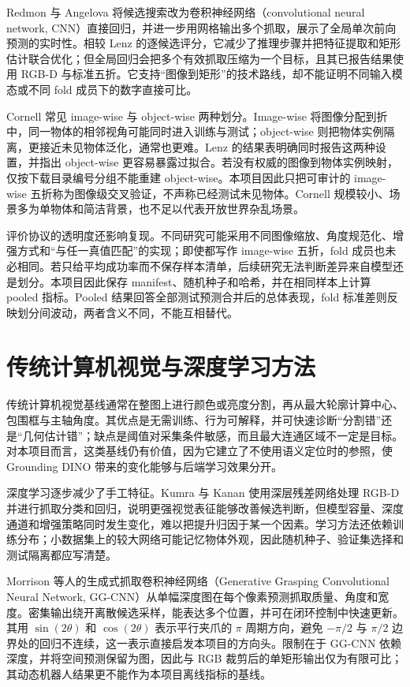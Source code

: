 \documentclass{l4proj}
\begin{document}
Redmon 与 Angelova 将候选搜索改为卷积神经网络（convolutional neural network, CNN）直接回归，并进一步用网格输出多个抓取，展示了全局单次前向预测的实时性\citep{redmon2015real}。相较 Lenz 的逐候选评分，它减少了推理步骤并把特征提取和矩形估计联合优化；但全局回归会把多个有效抓取压缩为一个目标，且其已报告结果使用 RGB-D 与标准五折。它支持“图像到矩形”的技术路线，却不能证明不同输入模态或不同 fold 成员下的数字直接可比。

Cornell 常见 image-wise 与 object-wise 两种划分。Image-wise 将图像分配到折中，同一物体的相邻视角可能同时进入训练与测试；object-wise 则把物体实例隔离，更接近未见物体泛化，通常也更难。Lenz 的结果表明确同时报告这两种设置，并指出 object-wise 更容易暴露过拟合。若没有权威的图像到物体实例映射，仅按下载目录编号分组不能重建 object-wise。本项目因此只把可审计的 image-wise 五折称为图像级交叉验证，不声称已经测试未见物体。Cornell 规模较小、场景多为单物体和简洁背景，也不足以代表开放世界杂乱场景。

评价协议的透明度还影响复现。不同研究可能采用不同图像缩放、角度规范化、增强方式和“与任一真值匹配”的实现；即使都写作 image-wise 五折，fold 成员也未必相同。若只给平均成功率而不保存样本清单，后续研究无法判断差异来自模型还是划分。本项目因此保存 manifest、随机种子和哈希，并在相同样本上计算 pooled 指标。Pooled 结果回答全部测试预测合并后的总体表现，fold 标准差则反映划分间波动，两者含义不同，不能互相替代。

\section{传统计算机视觉与深度学习方法}
传统计算机视觉基线通常在整图上进行颜色或亮度分割，再从最大轮廓计算中心、包围框与主轴角度。其优点是无需训练、行为可解释，并可快速诊断“分割错”还是“几何估计错”；缺点是阈值对采集条件敏感，而且最大连通区域不一定是目标。对本项目而言，这类基线仍有价值，因为它建立了不使用语义定位时的参照，使 Grounding DINO 带来的变化能够与后端学习效果分开。

深度学习逐步减少了手工特征。Kumra 与 Kanan 使用深层残差网络处理 RGB-D 并进行抓取分类和回归\citep{kumra2017robotic}，说明更强视觉表征能够改善候选判断，但模型容量、深度通道和增强策略同时发生变化，难以把提升归因于某一个因素。学习方法还依赖训练分布；小数据集上的较大网络可能记忆物体外观，因此随机种子、验证集选择和测试隔离都应写清楚。

Morrison 等人的生成式抓取卷积神经网络（Generative Grasping Convolutional Neural Network, GG-CNN）从单幅深度图在每个像素预测抓取质量、角度和宽度\citep{morrison2018closing}。密集输出绕开离散候选采样，能表达多个位置，并可在闭环控制中快速更新。其用 $\sin(2\theta)$ 和 $\cos(2\theta)$ 表示平行夹爪的 $\pi$ 周期方向，避免 $-\pi/2$ 与 $\pi/2$ 边界处的回归不连续，这一表示直接启发本项目的方向头。限制在于 GG-CNN 依赖深度，并将空间预测保留为图，因此与 RGB 裁剪后的单矩形输出仅为有限可比；其动态机器人结果更不能作为本项目离线指标的基线。
\end{document}
